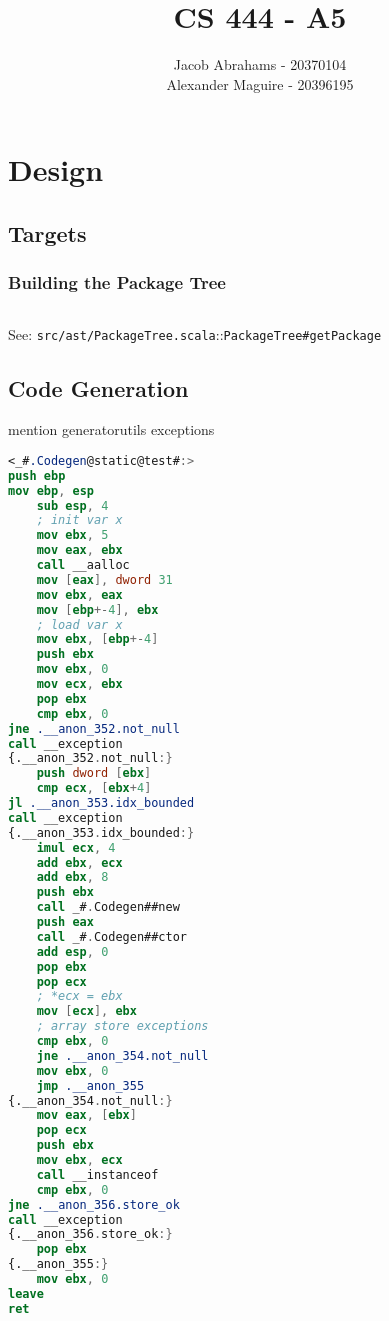 \documentclass{article}
\title{CS 444 - A5}
\author{Jacob Abrahams - 20370104\\ Alexander Maguire - 20396195}
\begin{document}
\newcommand\type[1]{\texttt{#1}}
\newcommand\func[1]{\texttt{#1}}
\newcommand\code[1]{\texttt{#1}}
\renewcommand\value[1]{\texttt{#1}}
\newcommand\source[2]{See: \texttt{src/#1.scala}::\type{#2} \\}
\newcommand\testsrc[1]{See: \texttt{test/#1.scala} \\}

\maketitle


\section{Design}

\subsection{Targets}
\subsubsection{Building the Package Tree}

\begin{lstlisting}[language=Scala]
\end{lstlisting}
\source{ast/PackageTree}{PackageTree\#getPackage}


\subsection{Code Generation}
mention generatorutils
exceptions

\begin{lstlisting}[language=nasm]
<_#.Codegen@static@test#:>
push ebp
mov ebp, esp
    sub esp, 4
    ; init var x
    mov ebx, 5
    mov eax, ebx
    call __aalloc
    mov [eax], dword 31
    mov ebx, eax
    mov [ebp+-4], ebx
    ; load var x
    mov ebx, [ebp+-4]
    push ebx
    mov ebx, 0
    mov ecx, ebx
    pop ebx
    cmp ebx, 0
jne .__anon_352.not_null
call __exception
{.__anon_352.not_null:}
    push dword [ebx]
    cmp ecx, [ebx+4]
jl .__anon_353.idx_bounded
call __exception
{.__anon_353.idx_bounded:}
    imul ecx, 4
    add ebx, ecx
    add ebx, 8
    push ebx
    call _#.Codegen##new
    push eax
    call _#.Codegen##ctor
    add esp, 0
    pop ebx
    pop ecx
    ; *ecx = ebx
    mov [ecx], ebx
    ; array store exceptions
    cmp ebx, 0
    jne .__anon_354.not_null
    mov ebx, 0
    jmp .__anon_355
{.__anon_354.not_null:}
    mov eax, [ebx]
    pop ecx
    push ebx
    mov ebx, ecx
    call __instanceof
    cmp ebx, 0
jne .__anon_356.store_ok
call __exception
{.__anon_356.store_ok:}
    pop ebx
{.__anon_355:}
    mov ebx, 0
leave
ret
\end{lstlisting}
\end{document}
